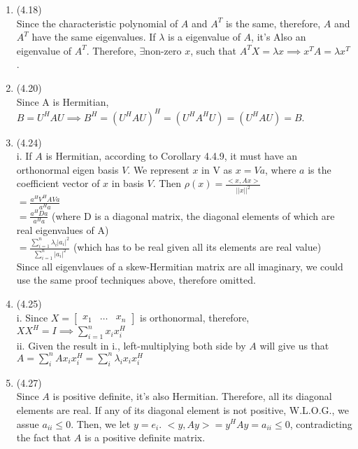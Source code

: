 \documentclass[letterpaper,12pt]{article}
\theoremstyle{definition}
\begin{document}
\begin{enumerate}
	\item(4.18)\\
	Since the characteristic polynomial of $A$ and $A^{T}$ is the same, therefore, $A$ and $A^{T}$ have the same eigenvalues. If $\lambda$ is a eigenvalue of $A$, it's Also an eigenvalue of $A^{T}$. Therefore, $\exists $non-zero $x$, such that $A^{T}X = \lambda x \implies x^{T}A =\lambda x^{T}$.\\

	\item(4.20)\\
	Since A is Hermitian, $B = U^{H}AU \implies B^{H} = ( U^{H}AU)^{H} = (U^{H}A^{H}U) = (U^{H}AU) = B$.\\
	
	\item(4.24)\\
	i. If $A$ is Hermitian, according to Corollary 4.4.9, it must have an orthonormal eigen basis $V$. We represent $x$ in V as $x = Va$, where $a$ is the coefficient vector of $x$ in basis $V$. Then $\rho(x) = \frac{<x, Ax>}{||x||^{2}}$\\
 	   $ = \frac{a^{H}V^{H}AVa}{a^{H}a}$\\
	   $ = \frac{a^{H}Da}{a^{H}a}$ (where D is a diagonal matrix, the diagonal elements of which are real eigenvalues of A)\\
	   $ = \frac{\sum_{i = 1}^{n} \lambda_{i}|a_{i}|^{2}}{\sum_{i = 1}^{n} |a_{i}|^{2}}$ (which has to be real given all its elements are real value)\\
	Since all eigenvlaues of a skew-Hermitian matrix are all imaginary, we could use the same proof techniques above, therefore omitted.\\

	\item(4.25)\\
	i. Since $X = \begin{bmatrix}
	  x_{1} &  \hdots & x_{n}
	\end{bmatrix}$ is orthonormal, therefore, $XX^{H} = I \implies \sum_{i = 1}^{n}x_{i}x_{i}^{H}$\\
	ii. Given the result in i., left-multiplying both side by $A$ will give us that $A = \sum_{i}^{n} Ax_{i}x_{i}^{H} = \sum_{i}^{n} \lambda_{i} x_{i}x_{i}^{H}$\\

	\item(4.27)\\
	Since $A$ is positive definite, it's also Hermitian. Therefore, all its diagonal elements are real. If any of its diagonal element is not positive, W.L.O.G., we assue $a_{ii} \leq 0$. Then, we let $y = e_{i}$. $<y, Ay> = y^{H}Ay = a_{ii} \leq 0$, contradicting the fact that $A$ is a positive definite matrix.\\


\end{enumerate}
\end{document}
